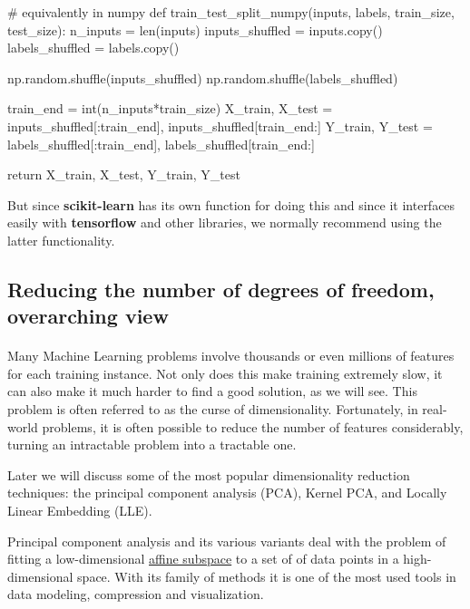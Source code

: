 \documentclass[%
oneside,                 %
final,                   %
10pt]{article}
\begin{document}
\bpycod
# equivalently in numpy
def train_test_split_numpy(inputs, labels, train_size, test_size):
    n_inputs = len(inputs)
    inputs_shuffled = inputs.copy()
    labels_shuffled = labels.copy()

    np.random.shuffle(inputs_shuffled)
    np.random.shuffle(labels_shuffled)

    train_end = int(n_inputs*train_size)
    X_train, X_test = inputs_shuffled[:train_end], inputs_shuffled[train_end:]
    Y_train, Y_test = labels_shuffled[:train_end], labels_shuffled[train_end:]

    return X_train, X_test, Y_train, Y_test

\epycod


But since \textbf{scikit-learn} has its own function for doing this and since
it interfaces easily with \textbf{tensorflow} and other libraries, we
normally recommend using the latter functionality.

\subsection{Reducing the number of degrees of freedom, overarching view}

\paragraph{}

Many Machine Learning problems involve thousands or even millions of
features for each training instance. Not only does this make training
extremely slow, it can also make it much harder to find a good
solution, as we will see. This problem is often referred to as the
curse of dimensionality.  Fortunately, in real-world problems, it is
often possible to reduce the number of features considerably, turning
an intractable problem into a tractable one.

Later  we will discuss some of the most popular dimensionality reduction
techniques: the principal component analysis (PCA), Kernel PCA, and
Locally Linear Embedding (LLE).  

Principal component analysis and its various variants deal with the
problem of fitting a low-dimensional \href{{https://en.wikipedia.org/wiki/Affine_space}}{affine
subspace} to a set of of
data points in a high-dimensional space. With its family of methods it
is one of the most used tools in data modeling, compression and
visualization.
\end{document}
